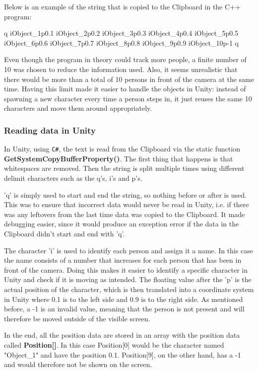 Below is an example of the string that is copied to the Clipboard in the C++ program:

q iObject\_1p0.1 iObject\_2p0.2 iObject\_3p0.3 iObject\_4p0.4 iObject\_5p0.5 iObject\_6p0.6 iObject\_7p0.7 iObject\_8p0.8 iObject\_9p0.9 iObject\_10p-1 q

Even though the program in theory could track more people, a finite number of 10 was chosen to reduce the information used. Also, it seems unrealistic that there would be more than a total of 10 persons in front of the camera at the same time. Having this limit made it easier to handle the objects in Unity: instead of spawning a new character every time a person steps in, it just reuses the same 10 characters and move them around appropriately.

\subsubsection{Reading data in Unity}
In Unity, using \texttt{C\#}, the text is read from the Clipboard via the static function \textbf{GetSystemCopyBufferProperty()}. The first thing that happens is that whitespaces are removed. Then the string is split multiple times using different delimit characters such as the q's, i's and p's.

'q' is simply used to start and end the string, so nothing before or after is used. This was to ensure that incorrect data would never be read in Unity, i.e. if there was any leftovers from the last time data was copied to the Clipboard. It made debugging easier, since it would produce an exception error if the data in the Clipboard didn't start and end with 'q'.

The character 'i' is used to identify each person and assign it a name. In this case the name consists of a number that increases for each person that has been in front of the camera. Doing this makes it easier to identify a specific character in Unity and check if it is moving as intended. The floating value after the 'p' is the actual position of the character, which is then translated into a coordinate system in Unity where 0.1 is to the left side and 0.9 is to the right side. As mentioned before, a -1 is an invalid value, meaning that the person is not present and will therefore be moved outside of the visible screen.

In the end, all the position data are stored in an array with the position data called \textbf{Position[]}. In this case Position[0] would be the character named "Object\_1" and have the position 0.1. Position[9], on the other hand, has a -1 and would therefore not be shown on the screen.

